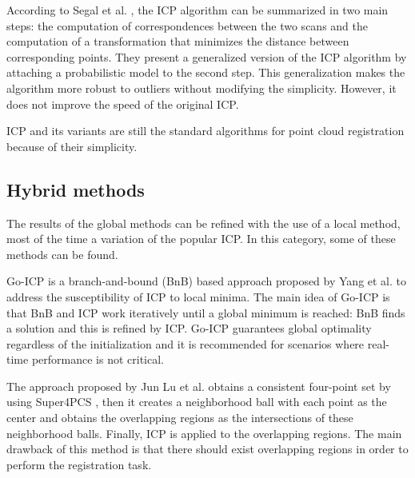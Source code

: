         According to Segal et al. \cite{Segal_2009_generalizedicp}, the ICP algorithm can be summarized in two main steps:
        the computation of correspondences between the two scans and 
        the computation of a transformation that minimizes the distance between corresponding points.
        They present a generalized version of the ICP algorithm by attaching a probabilistic model to the second step.
        This generalization makes the algorithm more robust to outliers without modifying the simplicity. 
        However, it does not improve the speed of the original ICP.

        ICP and its variants are still the standard algorithms for point cloud registration because of their simplicity. 

        \subsection{Hybrid methods}

        The results of the global methods can be refined with the use of a local method, most of the time a variation of the popular ICP.
        In this category, some of these methods can be found.

        Go-ICP is a branch-and-bound (BnB) based approach proposed by Yang et al. \cite{Yang_2016_goicp} to address the susceptibility of ICP to local minima. 
        The main idea of Go-ICP is that BnB and ICP work iteratively until a global minimum is reached: BnB finds a solution and this is refined by ICP.
        Go-ICP guarantees global optimality regardless of the initialization and it is recommended for scenarios where real-time performance is not critical.

        The approach proposed by Jun Lu et al. \cite{Lu_2019_4pcsicp} obtains a consistent four-point set by using Super4PCS \cite{Mellado_2014_super4pcs}, 
        then it creates a neighborhood ball with each point as the center and obtains the overlapping regions as the intersections
        of these neighborhood balls. Finally, ICP is applied to the overlapping regions. The main drawback of this method is that 
        there should exist overlapping regions in order to perform the registration task.

